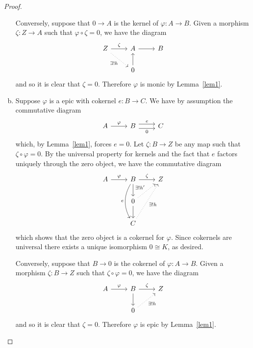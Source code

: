\documentclass[10pt]{amsart}
\begin{document}
\begin{lem}
\begin{proof}
\begin{enumerate}[(a)]
      Conversely, suppose that $0 \rightarrow A$ is the kernel of $\varphi : A \rightarrow B$.
      Given a morphism $\zeta : Z \rightarrow A$ such that $\varphi \circ \zeta = 0$, we have the diagram
      $$\begin{tikzcd}
	Z \arrow[dotted,swap]{rd}{\exists ! h} \arrow{r}{\zeta} &A \arrow{r} &B\\
	& 0\arrow{u}
      \end{tikzcd}$$
      and so it is clear that $\zeta = 0$.
      Therefore $\varphi$ is monic by Lemma~\ref{lem1}.
    \item
      Suppose $\varphi$ is a epic with cokernel $e : B \rightarrow C$.
      We have by assumption the commutative diagram
      $$\begin{tikzcd}
	A\arrow{r}{\varphi} & B \arrow[shift left = 0.75ex]{r}{e} \arrow[shift right=0.75ex, swap]{r}{0} & C
      \end{tikzcd}$$
      which, by Lemma~\ref{lem1}, forces $e = 0$.
      Let $\zeta : B \rightarrow Z$ be any map such that $\zeta \circ \varphi = 0$.
      By the universal property for kernels and the fact that $e$ factors uniquely through the zero object, we have the commutative diagram
      $$\begin{tikzcd}
	A \arrow{r}{\varphi}& B \arrow[bend right,swap]{dd}{e}\arrow{d}\arrow{r}{\zeta}& Z\\
	& 0\arrow{d}\arrow[dotted]{ru}{\exists ! h'}\\
	& C\arrow[dotted, swap]{ruu}{\exists ! h}
      \end{tikzcd}$$
      which shows that the zero object is a cokernel for $\varphi$.
      Since cokernels are universal there exists a unique isomorphism $0 \cong  K$, as desired.
      
      Conversely, suppose that $B \rightarrow 0$ is the cokernel of $\varphi : A \rightarrow B$.
      Given a morphism $\zeta : B \rightarrow Z$ such that $\zeta \circ \varphi= 0$, we have the diagram
      $$\begin{tikzcd}
	A \arrow{r}{\varphi}& B \arrow{d} \arrow{r}{\zeta} & Z\\
	& 0\arrow[dotted,swap]{ur}{\exists ! h}
      \end{tikzcd}$$
      and so it is clear that $\zeta = 0$.
      Therefore $\varphi$ is epic by Lemma~\ref{lem1}.
    \end{enumerate}
  \end{proof}
\end{lem}
\end{document}
